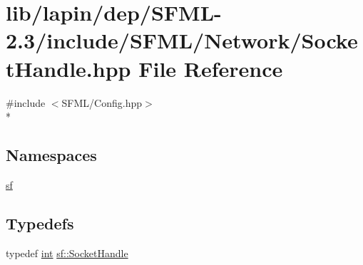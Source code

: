 \hypertarget{lapin_2dep_2_s_f_m_l-2_83_2include_2_s_f_m_l_2_network_2_socket_handle_8hpp}{\section{lib/lapin/dep/\-S\-F\-M\-L-\/2.3/include/\-S\-F\-M\-L/\-Network/\-Socket\-Handle.hpp File Reference}
\label{lapin_2dep_2_s_f_m_l-2_83_2include_2_s_f_m_l_2_network_2_socket_handle_8hpp}
}
{\ttfamily \#include $<$S\-F\-M\-L/\-Config.\-hpp$>$}\\*
\subsection*{Namespaces}
\begin{DoxyCompactItemize}
\item 
\hyperlink{namespacesf}{sf}
\end{DoxyCompactItemize}
\subsection*{Typedefs}
\begin{DoxyCompactItemize}
\item 
typedef \hyperlink{term__entry_8h_ad65b480f8c8270356b45a9890f6499ae}{int} \hyperlink{namespacesf_aefabb521d8f5eec9e6a9b521271d20d1}{sf\-::\-Socket\-Handle}
\end{DoxyCompactItemize}
